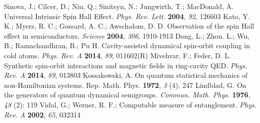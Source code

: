 \documentclass[atoms,article,submit,moreauthors,pdftex,12pt,a4paper]{mdpi}
\begin{document}
\begin{thebibliography}{999}
Sinova, J.; Cilcer, D.; Niu, Q.; Sinitsyn, N.; Jungwirth, T.; MacDonald, A. Universal Intrinsic Spin Hall Effect. {\em Phys. Rev. Lett.} {\bf 2004}, {\em 92}, 126603
Kato, Y. K.; Myers, R. C.; Gossard, A. C.; Awschalom, D. D. Observation of the spin Hall effect in semiconductors. {\em Science} {\bf 2004}, {\em 306}, 1910-1913
Dong, L.; Zhou. L.; Wu, B.; Ramachandhran, B.; Pu H. Cavity-assisted dynamical spin-orbit coupling in cold atoms. {\em Phys. Rev. A} {\bf 2014}, {\em 89}, 011602(R)
Mivehvar, F.; Feder, D. L. Synthetic spin-orbit interactions and magnetic fields in ring-cavity QED. {\em Phys. Rev. A} {\bf 2014}, {\em 89}, 013803
Kossakowski, A. On quantum statistical mechanics of non-Hamiltonian systems. {Rep. Math. Phys.} {\bf 1972}, {\em 3} (4), 247
Lindblad, G. On the generators of quantum dynamical semigroups. {\em Commun. Math. Phys.} {\bf 1976}, {\em 48} (2): 119
Vidal, G.; Werner, R. F.; Computable measure of entanglement. {\em Phys. Rev. A} {\bf 2002}, {\em 65}, 032314
\end{thebibliography}
\end{document}
